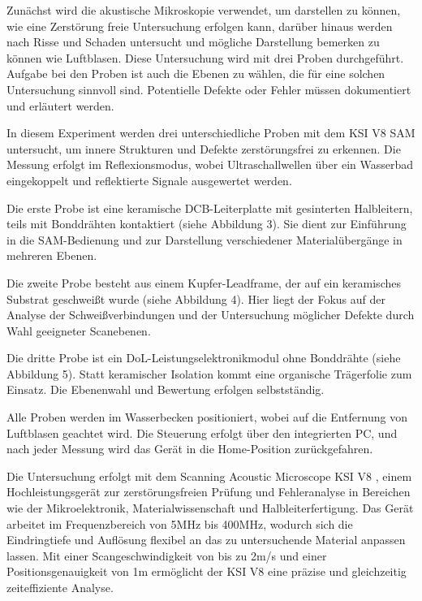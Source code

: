 Zunächst wird die akustische Mikroskopie verwendet, um darstellen zu können, wie eine Zerstörung freie Untersuchung erfolgen kann, darüber hinaus werden nach Risse und Schaden untersucht und mögliche Darstellung bemerken zu können wie Luftblasen. Diese Untersuchung wird mit drei Proben durchgeführt.
Aufgabe bei den Proben ist auch die Ebenen zu wählen, die für eine solchen Untersuchung sinnvoll sind.  Potentielle
Defekte oder Fehler müssen dokumentiert und erläutert werden.


In diesem Experiment werden drei unterschiedliche Proben mit dem KSI V8 SAM untersucht, um innere Strukturen und Defekte zerstörungsfrei zu erkennen. Die Messung erfolgt im Reflexionsmodus, wobei Ultraschallwellen über ein Wasserbad eingekoppelt und reflektierte Signale ausgewertet werden.

Die erste Probe ist eine keramische DCB-Leiterplatte mit gesinterten Halbleitern, teils mit Bonddrähten kontaktiert (siehe Abbildung 3). Sie dient zur Einführung in die SAM-Bedienung und zur Darstellung verschiedener Materialübergänge in mehreren Ebenen.

Die zweite Probe besteht aus einem Kupfer-Leadframe, der auf ein keramisches Substrat geschweißt wurde (siehe Abbildung 4). Hier liegt der Fokus auf der Analyse der Schweißverbindungen und der Untersuchung möglicher Defekte durch Wahl geeigneter Scanebenen.

Die dritte Probe ist ein DoL-Leistungselektronikmodul ohne Bonddrähte (siehe Abbildung 5). Statt keramischer Isolation kommt eine organische Trägerfolie zum Einsatz. Die Ebenenwahl und Bewertung erfolgen selbstständig.

Alle Proben werden im Wasserbecken positioniert, wobei auf die Entfernung von Luftblasen geachtet wird. Die Steuerung erfolgt über den integrierten PC, und nach jeder Messung wird das Gerät in die Home-Position zurückgefahren.



Die Untersuchung erfolgt mit dem Scanning Acoustic Microscope KSI V8 \cite{2}, einem Hochleistungsgerät zur zerstörungsfreien Prüfung und Fehleranalyse in Bereichen wie der Mikroelektronik, Materialwissenschaft und Halbleiterfertigung. Das Gerät arbeitet im Frequenzbereich von 5MHz bis 400MHz, wodurch sich die Eindringtiefe und Auflösung flexibel an das zu untersuchende Material anpassen lassen. Mit einer Scangeschwindigkeit von bis zu 2m/s und einer Positionsgenauigkeit von 1m ermöglicht der KSI V8 eine präzise und gleichzeitig zeiteffiziente Analyse.

